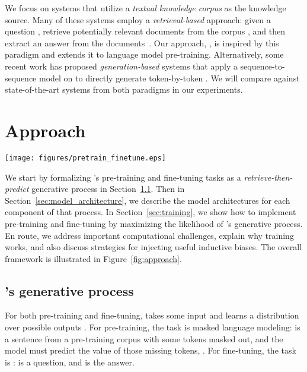 \documentclass{article}
\begin{document}
We focus on \openqa systems that utilize a \emph{textual knowledge corpus}  as the knowledge source.
Many of these systems employ a \emph{retrieval-based} approach:
given a question , retrieve potentially relevant documents  from the corpus ,
and then extract an answer  from the documents~\cite{askmsr,drqa,orqa}.
Our approach, \thename, is inspired by this paradigm and extends it to language model pre-training.
Alternatively, some recent work has proposed \emph{generation-based} systems that
apply a sequence-to-sequence model on  to directly generate  token-by-token
\cite{bart_not_bert,t5}.
We will compare against state-of-the-art systems from both paradigms in our experiments. \section{Approach} \label{sec:approach}
\begin{figure*}[t!]
\centering
\texttt{[image: figures/pretrain\_finetune.eps]}
\caption{The overall framework of \thename. {\bf Left:} {\em Unsupervised pre-training.} The knowledge retriever and knowledge-augmented encoder are jointly pre-trained on the unsupervised language modeling task. 
{\bf Right:} {\em Supervised fine-tuning.} After the parameters of the retriever () and encoder () have been pre-trained, they are then fine-tuned on a task of primary interest, using supervised examples.}
\label{fig:approach}
\end{figure*}

We start by formalizing \thename's pre-training and fine-tuning tasks as a {\em retrieve-then-predict} generative process in Section~\ref{sec:generative_process}. Then in Section~\ref{sec:model_architecture}, we describe the model architectures for each component of that process. In Section~\ref{sec:training}, we show how to implement \thename pre-training and fine-tuning by maximizing the likelihood of \thename's generative process. En route, we address important computational challenges, explain why training works, and also discuss strategies for injecting useful inductive biases. The overall framework is illustrated in Figure~\ref{fig:approach}.


\subsection{\thename's generative process}
\label{sec:generative_process}
For both pre-training and fine-tuning, \thename takes some input  and learns a distribution  over possible outputs . For pre-training, the task is masked language modeling:  is a sentence from a pre-training corpus  with some tokens masked out, and the model must predict the value of those missing tokens, . For fine-tuning, the task is \openqa:  is a question, and  is the answer.
\end{document}
